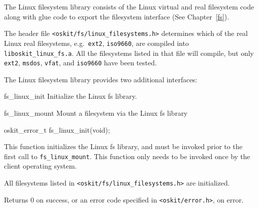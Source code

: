 %
% 
%
\label{linux-fs}

The Linux filesystem library consists of the Linux virtual and real
filesystem code along with glue code to export the \oskit{} filesystem
interface (See Chapter~\ref{fs}).

The header file \texttt{<oskit/fs/linux_filesystems.h>} determines which
of the real Linux real filesystems, e.g.\ \texttt{ext2}, \texttt{iso9660},
are compiled into \texttt{liboskit_linux_fs.a}.
All the filesystems listed in that file will compile,
but only \texttt{ext2}, \texttt{msdos}, \texttt{vfat}, and \texttt{iso9660}
have been tested.

The Linux filesystem library provides two additional interfaces:
\begin{icsymlist}
\item[fs_linux_init]
	Initialize the Linux fs library.
\item[fs_linux_mount]
	Mount a filesystem via the Linux fs library
\end{icsymlist}

\begin{apisyn}

	\funcproto oskit_error_t fs_linux_init(void);
\end{apisyn}
\ostofs
\begin{apidesc}
	This function initializes the Linux fs library,
	and must be invoked prior to the first
	call to {\tt fs_linux_mount}.  This function only
	needs to be invoked once by the client
	operating system.

        All filesystems listed in \texttt{<oskit/fs/linux_filesystems.h>}
        are initialized.
\end{apidesc}
\begin{apiret}
	Returns 0 on success, or an error code specified in
	{\tt <oskit/error.h>}, on error.
\end{apiret}



